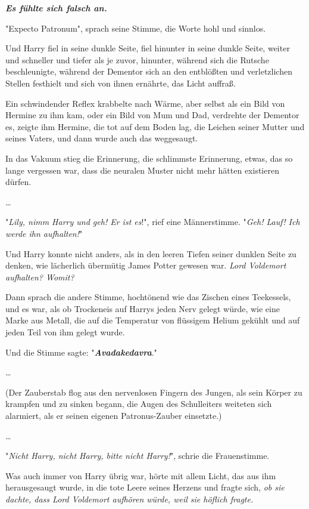 {\textbf{\emph{Es fühlte sich falsch an.}}

"Expecto Patronum", sprach seine Stimme, die Worte hohl und sinnlos.

Und Harry fiel in seine dunkle Seite, fiel hinunter in seine dunkle Seite, weiter und schneller und tiefer als je zuvor, hinunter, während sich die Rutsche beschleunigte, während der Dementor sich an den entblößten und verletzlichen Stellen festhielt und sich von ihnen ernährte, das Licht auffraß.

Ein schwindender Reflex krabbelte nach Wärme, aber selbst als ein Bild von Hermine zu ihm kam, oder ein Bild von Mum und Dad, verdrehte der Dementor es, zeigte ihm Hermine, die tot auf dem Boden lag, die Leichen seiner Mutter und seines Vaters, und dann wurde auch das weggesaugt.

In das Vakuum stieg die Erinnerung, die schlimmste Erinnerung, etwas, das so lange vergessen war, dass die neuralen Muster nicht mehr hätten existieren dürfen.

…

"\emph{Lily, nimm Harry und geh! Er ist es}!", rief eine Männerstimme. "\emph{Geh! Lauf! Ich werde ihn aufhalten!}"

Und Harry konnte nicht anders, als in den leeren Tiefen seiner dunklen Seite zu denken, wie lächerlich übermütig James Potter gewesen war. \emph{Lord Voldemort aufhalten? Womit?}

Dann sprach die andere Stimme, hochtönend wie das Zischen eines Teekessels, und es war, als ob Trockeneis auf Harrys jeden Nerv gelegt würde, wie eine Marke aus Metall, die auf die Temperatur von flüssigem Helium gekühlt und auf jeden Teil von ihm gelegt wurde.

Und die Stimme sagte: "\textbf{\emph{Avadakedavra}}."

…

(Der Zauberstab flog aus den nervenlosen Fingern des Jungen, als sein Körper zu krampfen und zu sinken begann, die Augen des Schulleiters weiteten sich alarmiert, als er seinen eigenen Patronus-Zauber einsetzte.)

…

"\emph{Nicht Harry, nicht Harry, bitte nicht Harry!}", schrie die Frauenstimme.

Was auch immer von Harry übrig war, hörte mit allem Licht, das aus ihm herausgesaugt wurde, in die tote Leere seines Herzens und fragte sich, \emph{ob sie dachte, dass Lord Voldemort aufhören würde, weil sie höflich fragte.}

}
